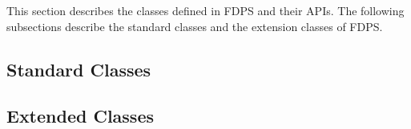 
This section describes the classes defined in FDPS and their APIs.
The following subsections describe the standard classes and the extension classes of FDPS.

\subsection{Standard Classes}



\subsection{Extended Classes}



